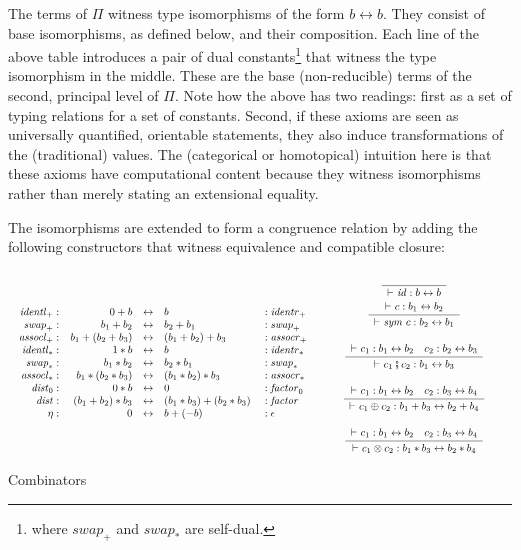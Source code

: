 \documentclass[authoryear,preprint]{sigplanconf}
\newcommand{\Rule}[4]{
\makebox{{\rm #1}
$\displaystyle
\frac{\begin{array}{l}#2\\\end{array}}
{\begin{array}{l}#3\\\end{array}}$
 #4}}
\newcommand{\proves}{\vdash}
\newcommand{\symc}[1]{\mathit{sym}~#1}
\newcommand{\jdg}[3]{#2 \proves_{#1} #3}
\newcommand{\iso}{\leftrightarrow}
\newcommand{\identlp}{\mathit{identl}_+}
\newcommand{\identrp}{\mathit{identr}_+}
\newcommand{\swapp}{\mathit{swap}_+}
\newcommand{\assoclp}{\mathit{assocl}_+}
\newcommand{\assocrp}{\mathit{assocr}_+}
\newcommand{\identlt}{\mathit{identl}_*}
\newcommand{\identrt}{\mathit{identr}_*}
\newcommand{\swapt}{\mathit{swap}_*}
\newcommand{\assoclt}{\mathit{assocl}_*}
\newcommand{\assocrt}{\mathit{assocr}_*}
\newcommand{\distz}{\mathit{dist}_0}
\newcommand{\factorz}{\mathit{factor}_0}
\newcommand{\dist}{\mathit{dist}}
\newcommand{\factor}{\mathit{factor}}
\newcommand{\idc}{\mathit{id}}
\begin{document}
The terms of $\Pi$ witness type isomorphisms of the form $b \iso b$. They
consist of base isomorphisms, as defined below, and their composition. Each
line of the above table introduces a pair of dual constants\footnote{where
  $\swapp$ and $\swapt$ are self-dual.} that witness the type isomorphism in
the middle.  These are the base (non-reducible) terms of the second,
principal level of $\Pi$. Note how the above has two readings: first as a set
of typing relations for a set of constants. Second, if these axioms are seen
as universally quantified, orientable statements, they also induce
transformations of the (traditional) values. The (categorical or homotopical)
intuition here is that these axioms have computational content because they
witness isomorphisms rather than merely stating an extensional equality.

The isomorphisms are extended to form a congruence relation by adding the
following constructors that witness equivalence and compatible closure:

\begin{table*}[t]
\[\begin{array}{cc}
\begin{array}{rrcll}
\identlp :&  0 + b & \iso & b &: \identrp \\
\swapp :&  b_1 + b_2 & \iso & b_2 + b_1 &: \swapp \\
\assoclp :&  b_1 + (b_2 + b_3) & \iso & (b_1 + b_2) + b_3 &: \assocrp \\
\identlt :&  1 * b & \iso & b &: \identrt \\
\swapt :&  b_1 * b_2 & \iso & b_2 * b_1 &: \swapt \\
\assoclt :&  b_1 * (b_2 * b_3) & \iso & (b_1 * b_2) * b_3 &: \assocrt \\
\distz :&~ 0 * b & \iso & 0 &: \factorz \\
\dist :&~ (b_1 + b_2) * b_3 & \iso & (b_1 * b_3) + (b_2 * b_3)~ &: \factor \\
\eta :&~ 0 & \iso & b + (-b)~ & : \epsilon
\end{array}
& 
\begin{minipage}{0.5\textwidth}
\begin{center} 
\Rule{}
{}
{\jdg{}{}{\idc : b \iso b}}
{}
\qquad\qquad
\Rule{}
{\jdg{}{}{c : b_1 \iso b_2}}
{\jdg{}{}{\symc{c} : b_2 \iso b_1}}
{}
\\ \bigskip
\Rule{}
{\jdg{}{}{c_1 : b_1 \iso b_2} \quad c_2 : b_2 \iso b_3}
{\jdg{}{}{c_1 \fatsemi c_2 : b_1 \iso b_3}}
{}
\\ \bigskip
\Rule{}
{\jdg{}{}{c_1 : b_1 \iso b_2} \quad c_2 : b_3 \iso b_4}
{\jdg{}{}{c_1 \oplus c_2 : b_1 + b_3 \iso b_2 + b_4}}
{}
\\ \bigskip
\Rule{}
{\jdg{}{}{c_1 : b_1 \iso b_2} \quad c_2 : b_3 \iso b_4}
{\jdg{}{}{c_1 \otimes c_2 : b_1 * b_3 \iso b_2 * b_4}}
{}
\end{center}
\end{minipage}
\end{array}\]
\caption{Combinators\label{pi-combinators}}
\end{table*}
\end{document}

